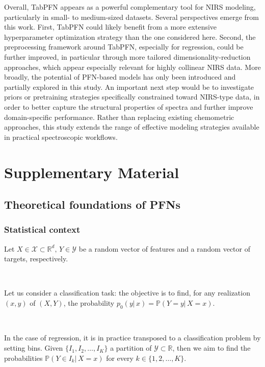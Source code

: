 \documentclass{article}
\begin{document}
Overall, TabPFN appears as a powerful complementary tool for NIRS modeling, particularly in small- to medium-sized datasets. Several perspectives emerge from this work. First, TabPFN could likely benefit from a more extensive hyperparameter optimization strategy than the one considered here. Second, the preprocessing framework around TabPFN, especially for regression, could be further improved, in particular through more tailored dimensionality-reduction approaches, which appear especially relevant for highly collinear NIRS data. More broadly, the potential of PFN-based models has only been introduced and partially explored in this study. An important next step would be to investigate priors or pretraining strategies specifically constrained toward NIRS-type data, in order to better capture the structural properties of spectra and further improve domain-specific performance. Rather than replacing existing chemometric approaches, this study extends the range of effective modeling strategies available in practical spectroscopic workflows.









\section{Supplementary Material}

\subsection{Theoretical foundations of PFNs} \label{theory_pfn}


\subsubsection{Statistical context}

Let $X \in \mathcal{X} \subset \mathbb{R}^d, \, Y \in \mathcal{Y}$ be a random vector of features and a random vector of targets, respectively.

~ 

Let us consider a classification task: the objective is to find, for any realization $(x,y)$ of $(X,Y)$, the probability $p_0(y|\, x) = \mathbb{P}(Y=y | \, X=x)$.

~ 

In the case of regression, it is in practice transposed to a classification problem by setting bins. Given $\{I_1, I_2, \dots, I_K \}$ a partition of $\mathcal{Y} \subset \mathbb{R}$, then we aim to find the probabilities $\mathbb{P}(Y \in I_k | \, X=x)$ for every $k \in \{1,2,\dots,K\}$.
\end{document}
